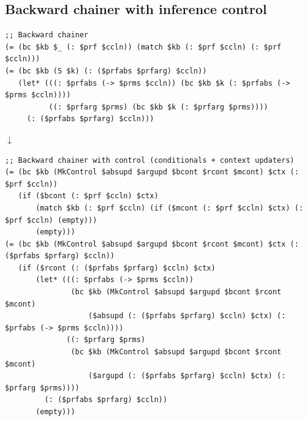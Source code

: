\documentclass[aspectratio=169]{beamer}
\begin{document}
\subsection{Backward chainer with inference control}


\begin{frame}[fragile]
  \begin{lstlisting}
;; Backward chainer
(= (bc $kb $_ (: $prf $ccln)) (match $kb (: $prf $ccln) (: $prf $ccln)))
(= (bc $kb (S $k) (: ($prfabs $prfarg) $ccln))
   (let* (((: $prfabs (-> $prms $ccln)) (bc $kb $k (: $prfabs (-> $prms $ccln))))
          ((: $prfarg $prms) (bc $kb $k (: $prfarg $prms))))
     (: ($prfabs $prfarg) $ccln)))
  \end{lstlisting}

  \begin{center} $\downarrow$ \end{center}

  \begin{lstlisting}
;; Backward chainer with control (conditionals + context updaters)
(= (bc $kb (MkControl $absupd $argupd $bcont $rcont $mcont) $ctx (: $prf $ccln))
   (if ($bcont (: $prf $ccln) $ctx)
       (match $kb (: $prf $ccln) (if ($mcont (: $prf $ccln) $ctx) (: $prf $ccln) (empty)))
       (empty)))
(= (bc $kb (MkControl $absupd $argupd $bcont $rcont $mcont) $ctx (: ($prfabs $prfarg) $ccln))
   (if ($rcont (: ($prfabs $prfarg) $ccln) $ctx)
       (let* (((: $prfabs (-> $prms $ccln))
               (bc $kb (MkControl $absupd $argupd $bcont $rcont $mcont)
                   ($absupd (: ($prfabs $prfarg) $ccln) $ctx) (: $prfabs (-> $prms $ccln))))
              ((: $prfarg $prms)
               (bc $kb (MkControl $absupd $argupd $bcont $rcont $mcont)
                   ($argupd (: ($prfabs $prfarg) $ccln) $ctx) (: $prfarg $prms))))
         (: ($prfabs $prfarg) $ccln))
       (empty)))
  \end{lstlisting}

\end{frame}
\end{document}
